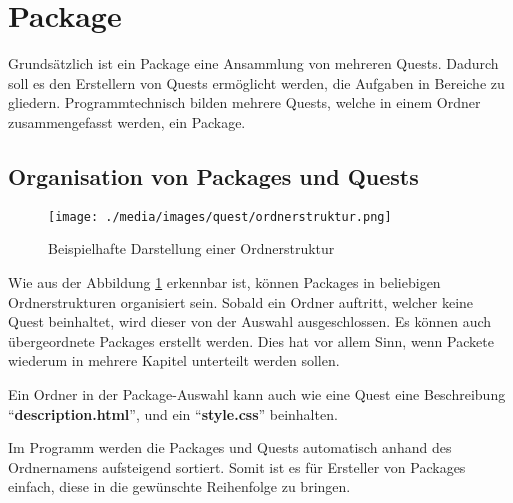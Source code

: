 \section{Package}
Grundsätzlich ist ein Package eine Ansammlung von mehreren Quests. Dadurch soll es den Erstellern von Quests ermöglicht werden, die Aufgaben in Bereiche zu gliedern. Programmtechnisch bilden mehrere Quests, welche in einem Ordner zusammengefasst werden, ein Package.

\subsection{Organisation von Packages und Quests}
\begin{figure}[h] 
  \centering
     \texttt{[image: ./media/images/quest/ordnerstruktur.png]}
  \caption{Beispielhafte Darstellung einer Ordnerstruktur}
  \label{fig:package_ordnerstruktur_1}
\end{figure}
Wie aus der Abbildung \ref{fig:package_ordnerstruktur_1} erkennbar ist, können Packages in beliebigen Ordnerstrukturen organisiert sein. Sobald ein Ordner auftritt, welcher keine Quest beinhaltet, wird dieser von der Auswahl ausgeschlossen. Es können auch übergeordnete Packages erstellt werden. Dies hat vor allem Sinn, wenn Packete wiederum in mehrere Kapitel unterteilt werden sollen.

Ein Ordner in der Package-Auswahl kann auch wie eine Quest eine Beschreibung “\textbf{description.html}”, und ein “\textbf{style.css}” beinhalten.

Im Programm werden die Packages und Quests automatisch anhand des Ordnernamens aufsteigend sortiert. Somit ist es für Ersteller von Packages einfach, diese in die gewünschte Reihenfolge zu bringen.